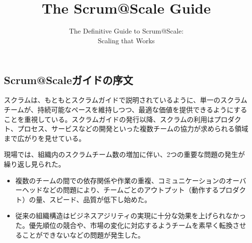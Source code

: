 \documentclass[12pt,a4paper,parskip=full]{scrartcl}
\title{\Huge{\color{red}\textbf{The Scrum@Scale 
\textsuperscript{\registered} 
Guide}}}
\subtitle{\color{gray}The Definitive Guide to Scrum@Scale:\\ Scaling that Works}
\date{}
\begin{document}
\tableofcontents

\subsection{Scrum@Scaleガイドの序文}\label{preface-to-the-ScrumatScale-guide}

スクラムは、もともとスクラムガイドで説明されているように、単一のスクラムチームが、持続可能なペースを維持しつつ、最適な価値を提供できるようにすることを重視している。スクラムガイドの発行以降、スクラムの利用はプロダクト、プロセス、サービスなどの開発といった複数チームの協力が求められる領域まで広がりを見せている。

現場では、組織内のスクラムチーム数の増加に伴い、2つの重要な問題の発生が繰り返し見られた。

\begin{itemize}%
\itemsep10pt

\item
複数のチームの間での依存関係や作業の重複、コミュニケーションのオーバーヘッドなどの問題により、チームごとのアウトプット（動作するプロダクト）の量、スピード、品質が低下し始めた。
\item
従来の組織構造はビジネスアジリティの実現に十分な効果を上げられなかった。優先順位の競合や、市場の変化に対応するようチームを素早く転換させることができないなどの問題が発生した。
\end{itemize}
\end{document}
